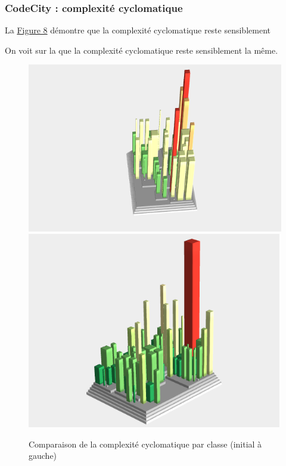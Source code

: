 \documentclass[a4paper,12pt]{report} %
\begin{document}
\subsubsection{CodeCity : complexité cyclomatique}
La \hyperref[figure8]{Figure 8} démontre que la complexité cyclomatique reste sensiblement

On voit sur la  que la complexité cyclomatique reste sensiblement
la même.

\begin{figure}[!h]
\includegraphics[scale=0.5]{ressources/final_initial_cyclomatic}\includegraphics[scale=0.5]{ressources/final_new_cyclomatic}\caption{Comparaison de la complexité cyclomatique par classe (initial à gauche)}\label{figure8}


\end{figure}
\end{document}
